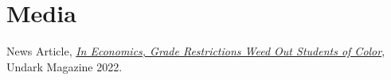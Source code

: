 \section{\sc Media}

News Article, \href{https://undark.org/2022/06/13/in-economics-grade-restrictions-weed-out-students-of-color/}{\textit{In Economics, Grade Restrictions Weed Out Students of Color}}, Undark Magazine 2022.